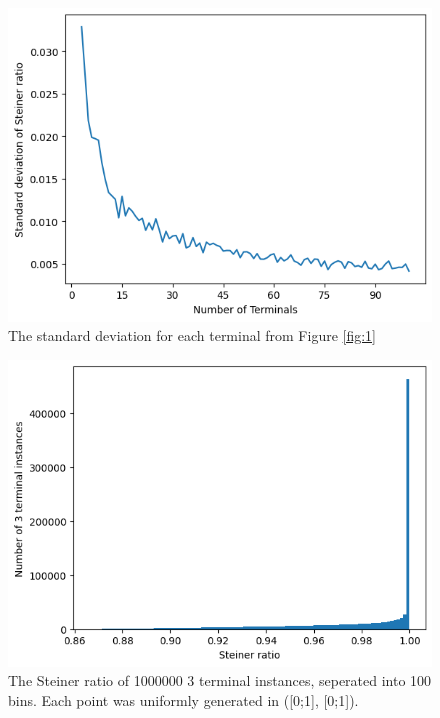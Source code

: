 \documentclass{mpaper}
\begin{document}
  \begin{figure}
    \begin{center}
    \includegraphics[scale=0.5]{plot3.png}
    \end{center}
    \caption{\label{fig:3} The standard deviation for each terminal from Figure \ref{fig:1}}
\end{figure}
  
\begin{figure}
  \begin{center}
  \includegraphics[scale=0.5]{plot4.png}
  \end{center}
  \caption{\label{fig:4} The Steiner ratio of 1000000 3 terminal instances, seperated into 100 bins. Each point was uniformly generated in ([0;1], [0;1]).}
\end{figure}
\end{document}

